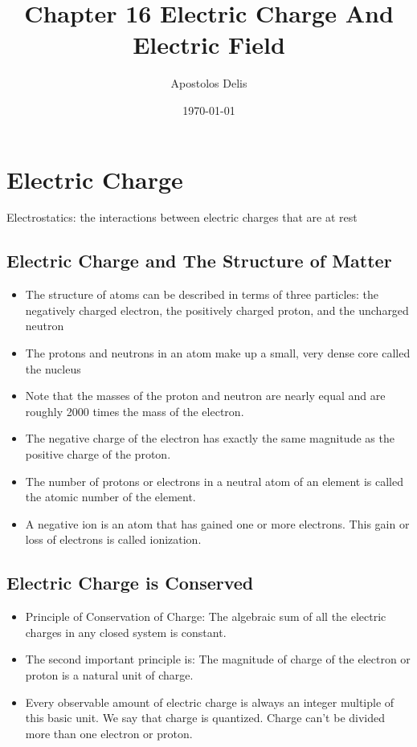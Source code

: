 \documentclass[11pt, a4paper]{article}
\begin{document}
\title{Chapter 16 Electric Charge And Electric Field}
\author{Apostolos Delis}
\date{\today}
\maketitle

\tableofcontents
\section[21.1, Electric Charge]{Electric Charge}
Electrostatics: the interactions between electric charges that are at rest
\subsection{Electric Charge and The Structure of Matter}
\begin{itemize}
    \item The structure of atoms can be described in terms of three particles: the
        negatively charged electron, the positively charged proton, and the uncharged
        neutron
    \item The protons and neutrons in an atom make up a small, very dense core called the
        nucleus
    \item Note that the masses of the proton and neutron are nearly equal and are roughly
        2000 times the mass of the electron.
    \item The negative charge of the electron has exactly the same magnitude as the
        positive charge of the proton.
    \item The number of protons or electrons in a neutral atom of an element is called
        the atomic number of the element.
    \item A negative ion is an atom that has gained one or more electrons. This gain or
        loss of electrons is called ionization.
\end{itemize}
\subsection{Electric Charge is Conserved}
\begin{itemize}
    \item Principle of Conservation of Charge: The algebraic sum of all the electric
        charges in any closed system is constant.
    \item The second important principle is: The magnitude of charge of the electron
        or proton is a natural unit of charge.
    \item Every observable amount of electric charge is always an integer multiple of this
        basic unit. We say that charge is quantized. Charge can't be divided more than
        one electron or proton.
\end{itemize}
\end{document}
